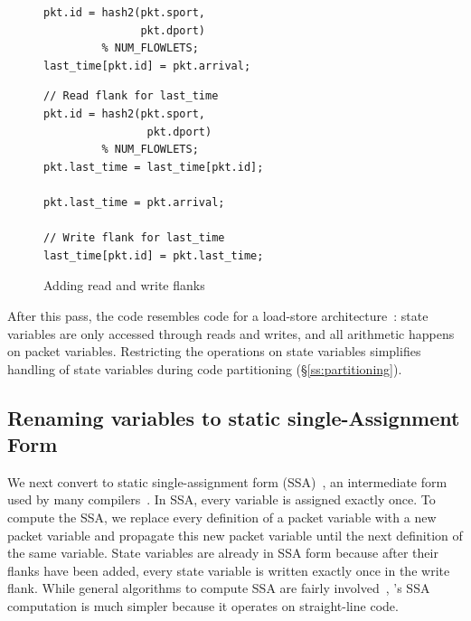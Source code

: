 \begin{figure}[!t]
  \begin{minipage}{0.47\textwidth}
  \begin{small}
  \begin{lstlisting}[style=customc]
pkt.id = hash2(pkt.sport,
               pkt.dport)
         % NUM_FLOWLETS;
last_time[pkt.id] = pkt.arrival;
  \end{lstlisting}
  \end{small}
  \end{minipage}
  \begin{minipage}{0.53\textwidth}
  \begin{small}
  \begin{lstlisting}[style=customc]
// Read flank for last_time
pkt.id = hash2(pkt.sport,
                pkt.dport)
         % NUM_FLOWLETS;
pkt.last_time = last_time[pkt.id];

pkt.last_time = pkt.arrival;

// Write flank for last_time
last_time[pkt.id] = pkt.last_time;
  \end{lstlisting}
  \end{small}
  \end{minipage}
  \caption{Adding read and write flanks}
\label{fig:stateful_flanks}
\end{figure}

After this pass, the code resembles code for a load-store
architecture~\cite{load_store}: state variables are only accessed through reads
and writes, and all arithmetic happens on packet variables. Restricting the
operations on state variables simplifies handling of state variables during
code partitioning (\S\ref{ss:partitioning}).

\subsection{Renaming variables to static single-Assignment Form}
\label{ss:ssa}

We next convert to static single-assignment form (SSA)~\cite{ssa}, an
intermediate form used by many compilers~\cite{tree_ssa, llvm}.  In SSA, every
variable is assigned exactly once. To compute the SSA, we replace every
definition of a packet variable with a new packet variable and propagate this
new packet variable until the next definition of the same variable. State
variables are already in SSA form because after their flanks have been added,
every state variable is written exactly once in the write flank.  While general
algorithms to compute SSA are fairly involved~\cite{ssa}, \pktlanguage's SSA
computation is much simpler because it operates on straight-line code.

